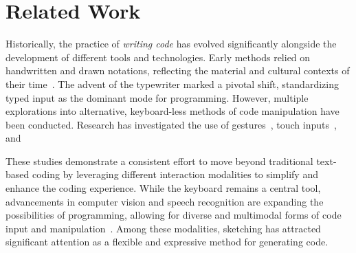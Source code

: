 \section{Related Work}
Historically, the practice of \textit{writing code} has evolved significantly alongside the development of different tools and technologies. Early methods relied on handwritten and drawn notations, reflecting the material and cultural contexts of their time~\cite{arawjo_write_2020}. 
The advent of the typewriter marked a pivotal shift, standardizing typed input as the dominant mode for programming.
However, multiple explorations into alternative, keyboard-less methods of code manipulation have been conducted. Research has investigated the use of gestures~\cite{murphy2011restructuring}, touch inputs~\cite{tillmann2012touchdevelop, raab_refactorpad_2013, 10.1145/1879211.1879217}, and 




These studies demonstrate a consistent effort to move beyond traditional text-based coding by leveraging different interaction modalities to simplify and enhance the coding experience.
While the keyboard remains a central tool, advancements in computer vision and speech recognition are expanding the possibilities of programming, allowing for diverse and multimodal forms of code input and manipulation~\cite{pollock2024designing, horowitz2023live}.
Among these modalities, sketching has attracted significant attention as a flexible and expressive method for generating code.


